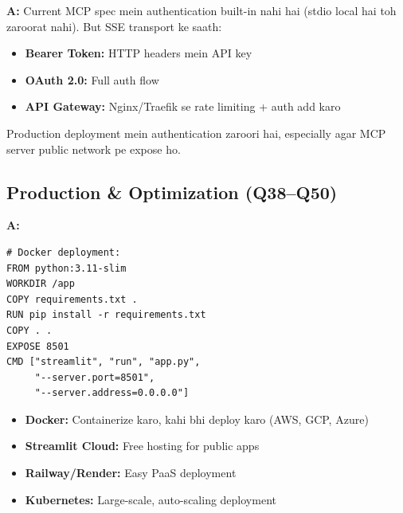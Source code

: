 \documentclass[12pt, a4paper]{article}
\begin{document}
\begin{interviewbox}[title={\faIcon{user-tie} ~Q37: Kya MCP server mein authentication add kar sakte ho?}]
\textbf{A:} Current MCP spec mein authentication built-in nahi hai (stdio local hai toh zaroorat nahi). But SSE transport ke saath:
\begin{itemize}
\item \textbf{Bearer Token:} HTTP headers mein API key
\item \textbf{OAuth 2.0:} Full auth flow
\item \textbf{API Gateway:} Nginx/Traefik se rate limiting + auth add karo
\end{itemize}

Production deployment mein authentication zaroori hai, especially agar MCP server public network pe expose ho.
\end{interviewbox}

\subsection{Production \& Optimization (Q38--Q50)}

\begin{interviewbox}[title={\faIcon{user-tie} ~Q38: Production mein deploy kaise karenge?}]
\textbf{A:}
\begin{lstlisting}[style=bashstyle]
# Docker deployment:
FROM python:3.11-slim
WORKDIR /app
COPY requirements.txt .
RUN pip install -r requirements.txt
COPY . .
EXPOSE 8501
CMD ["streamlit", "run", "app.py",
     "--server.port=8501",
     "--server.address=0.0.0.0"]
\end{lstlisting}

\begin{itemize}
\item \textbf{Docker:} Containerize karo, kahi bhi deploy karo (AWS, GCP, Azure)
\item \textbf{Streamlit Cloud:} Free hosting for public apps
\item \textbf{Railway/Render:} Easy PaaS deployment
\item \textbf{Kubernetes:} Large-scale, auto-scaling deployment
\end{itemize}
\end{interviewbox}
\end{document}
